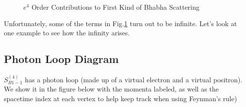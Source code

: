 \begin{figure}[H]
\begin{tikzpicture}[x=0.75pt,y=0.75pt,yscale=-1,xscale=1]
\end{tikzpicture}
    \caption{$e^4$ Order Contributions to First Kind of Bhabha Scattering}
    \label{fig:4-order-contribution-Bhabha}
\end{figure}
Unfortunately, some of the terms in Fig.\ref{fig:4-order-contribution-Bhabha} turn out to be infinite. Let's look at one example to see how the infinity arises.
\subsection{Photon Loop Diagram}
$S_{B1-1}^{(4)}$ has a photon loop (made up of a virtual electron and a virtual positron). We show it in the figure below with the momenta labeled, as well as the spacetime index at each vertex to help keep track when using Feynman's rule)
\begin{figure}[H]
    \centering
{} %

\begin{tikzpicture}[x=0.75pt,y=0.75pt,yscale=-1,xscale=1]


\end{tikzpicture}
\end{figure}
